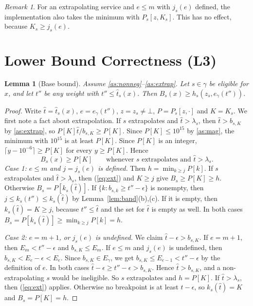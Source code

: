 \documentclass[11pt]{article}
\newtheorem{lemma}[theorem]{Lemma}
\theoremstyle{definition}
\theoremstyle{remark}
\newtheorem{remark}[theorem]{Remark}
\begin{document}
\begin{remark}
For an extrapolating service and $e\le m$ with $j_s(e)$ defined, the implementation also
takes the minimum with $P_s[z,K_s]$. This has no effect, because $K_s\ge j_s(e)$.
\end{remark}

\section{Lower Bound Correctness (L3)}\label{sec:L3}

\begin{lemma}[Base bound]\label{lem:base}
Assume \ref{as:nonneg}--\ref{as:extrap}. Let $s\in\gamma$ be eligible for $x$, and let $t''$ be
any weight with $t''\le\hat t_s(x)$. Then $B_s(x)\ge h_s(z_s,e_\gamma(t''))$.
\end{lemma}
\begin{proof}
Write $\hat t=\hat t_s(x)$, $e=e_\gamma(t'')$, $z=z_s\ne\bot$, $P=P_s[z,\cdot]$ and $K=K_s$. We
first note a fact about extrapolation. If $s$ extrapolates and $\hat t>\lambda_s$, then
$\hat t>b_{s,K}$ by \ref{as:extrap}, so $P[K]\hat t/b_{s,K}\ge P[K]$. Since $P[K]\le 10^{15}$
by \ref{as:mag}, the minimum with $10^{15}$ is at least $P[K]$. Since $P[K]$ is an integer,
$\lceil y-10^{-6}\rceil\ge P[K]$ for every $y\ge P[K]$. Hence
\begin{equation}\label{eq:ext}
B_s(x)\ge P[K]\qquad\text{whenever $s$ extrapolates and $\hat t>\lambda_s$.}
\end{equation}
\emph{Case 1: $e\le m$ and $j=j_s(e)$ is defined.} Then $h=\min_{k\ge j}P[k]$. If $s$
extrapolates and $\hat t>\lambda_s$, then (\ref{eq:ext}) and $K\ge j$ give $B_s\ge P[K]\ge h$.
Otherwise $B_s=P[k_s(\hat t)]$. If $\{k:b_{s,k}\ge t''-\epsilon\}$ is nonempty, then
$j\le k_s(t'')\le k_s(\hat t)$ by Lemma~\ref{lem:band}(b),(c). If it is empty, then
$k_s(\hat t)=K\ge j$, because $t''\le\hat t$ and the set for $\hat t$ is empty as well. In both
cases $B_s=P[k_s(\hat t)]\ge\min_{k\ge j}P[k]=h$.

\emph{Case 2: $e=m+1$, or $j_s(e)$ is undefined.} We claim $\hat t-\epsilon>b_{s,K}$. If
$e=m+1$, then $E_m<t''-\epsilon$ and $b_{s,K}\le E_m$. If $e\le m$ and $j_s(e)$ is undefined,
then $b_{s,K}<E_e-\epsilon<E_e$. Since $b_{s,K}\in E_\gamma$, we get $b_{s,K}\le E_{e-1}<t''-\epsilon$
by the definition of $e$. In both cases $\hat t-\epsilon\ge t''-\epsilon>b_{s,K}$. Hence
$\hat t>b_{s,K}$, and a non-extrapolating $s$ would be ineligible. So $s$ extrapolates and
$h=P[K]$. If $\hat t>\lambda_s$, then (\ref{eq:ext}) applies. Otherwise no breakpoint is at
least $\hat t-\epsilon$, so $k_s(\hat t)=K$ and $B_s=P[K]=h$.
\end{proof}
\end{document}
